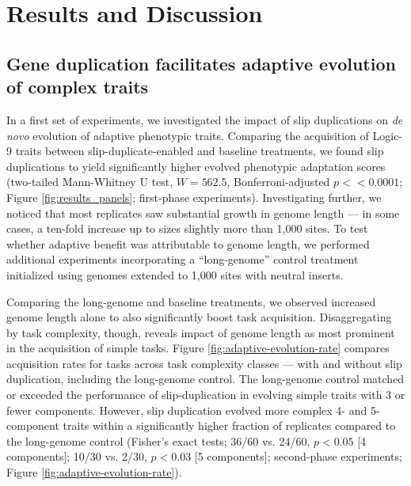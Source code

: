\section{Results and Discussion} \label{sec:results}

\subsection{Gene duplication facilitates adaptive evolution of complex traits}

In a first set of experiments, we investigated the impact of slip duplications on \textit{de novo} evolution of adaptive phenotypic traits.
Comparing the acquisition of Logic-9 traits between slip-duplicate-enabled and baseline treatments, we found slip duplications to yield significantly higher evolved phenotypic adaptation scores (two-tailed Mann-Whitney U test, $W = 562.5$, Bonferroni-adjusted $p << 0.0001$; Figure \ref{fig:results_panels}; first-phase experiments).
Investigating further, we noticed that most replicates saw substantial growth in genome length --- in some cases, a ten-fold increase up to sizes slightly more than 1,000 sites.
To test whether adaptive benefit was attributable to genome length, we performed additional experiments incorporating a ``long-genome'' control treatment initialized using genomes extended to 1,000 sites with neutral inserts.



Comparing the long-genome and baseline treatments, we observed increased genome length alone to also significantly boost task acquisition.
Disaggregating by task complexity, though, reveals impact of genome length as most prominent in the acquisition of simple tasks.
Figure \ref{fig:adaptive-evolution-rate} compares acquisition rates for tasks across task complexity classes --- with and without slip duplication, including the long-genome control.
The long-genome control matched or exceeded the performance of slip-duplication in evolving simple traits with 3 or fewer components.
However, slip duplication evolved more complex 4- and 5-component traits within a significantly higher fraction of replicates compared to the long-genome control (Fisher's exact tests; 36/60 vs. 24/60, $p<0.05$ [4 components]; 10/30 vs. 2/30, $p<0.03$ [5 components]; second-phase experiments; Figure \ref{fig:adaptive-evolution-rate}).

